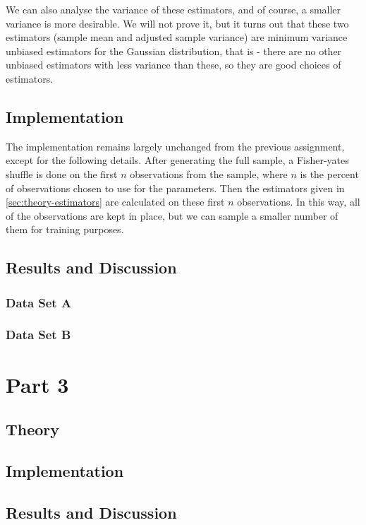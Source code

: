 \documentclass[headings=optiontoheadandtoc,listof=totoc,parskip=full]{scrartcl}
\begin{document}
We can also analyse the variance of these estimators, and of course, a smaller variance is more desirable. We will not prove it, but it turns out that these two estimators (sample mean and adjusted sample variance) are minimum variance unbiased estimators for the Gaussian distribution, that is - there are no other unbiased estimators with less variance than these, so they are good choices of estimators.

\subsection{Implementation}
\label{sec:part-1-impl}

The implementation remains largely unchanged from the previous assignment, except for the following details. After generating the full sample, a Fisher-yates shuffle is done on the first $n$ observations from the sample, where $n$ is the percent of observations chosen to use for the parameters. Then the estimators given in \cref{sec:theory-estimators} are calculated on these first $n$ observations. In this way, all of the observations are kept in place, but we can sample a smaller number of them for training purposes.

\subsection{Results and Discussion}

\subsubsection{Data Set A}
\label{sec:results-bayes-a}


\subsubsection{Data Set B}


\section{Part 3}
\label{sec:part-3}

\subsection{Theory}
\label{sec:part-3-theory}


\subsection{Implementation}
\label{sec:part-3-impl}


\subsection{Results and Discussion}
\end{document}
